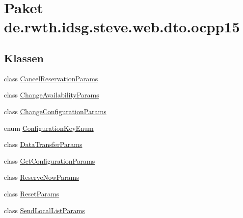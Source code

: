 \hypertarget{namespacede_1_1rwth_1_1idsg_1_1steve_1_1web_1_1dto_1_1ocpp15}{\section{Paket de.\+rwth.\+idsg.\+steve.\+web.\+dto.\+ocpp15}
\label{namespacede_1_1rwth_1_1idsg_1_1steve_1_1web_1_1dto_1_1ocpp15}
}
\subsection*{Klassen}
\begin{DoxyCompactItemize}
\item 
class \hyperlink{classde_1_1rwth_1_1idsg_1_1steve_1_1web_1_1dto_1_1ocpp15_1_1_cancel_reservation_params}{Cancel\+Reservation\+Params}
\item 
class \hyperlink{classde_1_1rwth_1_1idsg_1_1steve_1_1web_1_1dto_1_1ocpp15_1_1_change_availability_params}{Change\+Availability\+Params}
\item 
class \hyperlink{classde_1_1rwth_1_1idsg_1_1steve_1_1web_1_1dto_1_1ocpp15_1_1_change_configuration_params}{Change\+Configuration\+Params}
\item 
enum \hyperlink{enumde_1_1rwth_1_1idsg_1_1steve_1_1web_1_1dto_1_1ocpp15_1_1_configuration_key_enum}{Configuration\+Key\+Enum}
\item 
class \hyperlink{classde_1_1rwth_1_1idsg_1_1steve_1_1web_1_1dto_1_1ocpp15_1_1_data_transfer_params}{Data\+Transfer\+Params}
\item 
class \hyperlink{classde_1_1rwth_1_1idsg_1_1steve_1_1web_1_1dto_1_1ocpp15_1_1_get_configuration_params}{Get\+Configuration\+Params}
\item 
class \hyperlink{classde_1_1rwth_1_1idsg_1_1steve_1_1web_1_1dto_1_1ocpp15_1_1_reserve_now_params}{Reserve\+Now\+Params}
\item 
class \hyperlink{classde_1_1rwth_1_1idsg_1_1steve_1_1web_1_1dto_1_1ocpp15_1_1_reset_params}{Reset\+Params}
\item 
class \hyperlink{classde_1_1rwth_1_1idsg_1_1steve_1_1web_1_1dto_1_1ocpp15_1_1_send_local_list_params}{Send\+Local\+List\+Params}
\end{DoxyCompactItemize}
